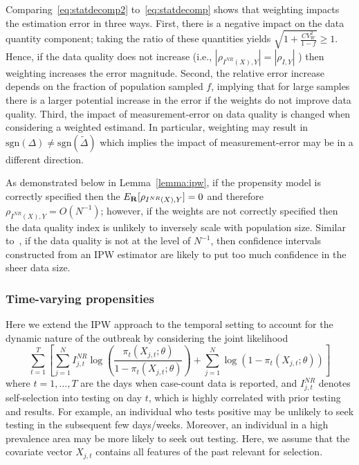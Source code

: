 \documentclass[11pt]{amsart}
\numberwithin{equation}{section}
\theoremstyle{plain}
\begin{document}
 Comparing~\eqref{eq:statdecomp2} to~\eqref{eq:statdecomp} shows that weighting impacts the estimation error in three ways.  First, there is a negative impact on the data quantity component; taking the ratio of these quantities yields
 $\sqrt{1 + \frac{CV_W^2}{1-f}} \geq 1$.  Hence, if the data quality does not increase (i.e., $| \rho_{I^{NR} (X), Y} | = | \rho_{I,Y}|$ ) then weighting increases the error magnitude.  Second, the relative error increase depends on the fraction of population sampled $f$, implying that for large samples there is a larger potential increase in the error if the weights do not improve data quality. Third, the impact of measurement-error on data quality is changed when considering a weighted estimand. In particular, weighting may result in $\text{sgn}(\Delta) \neq \text{sgn} (\tilde \Delta)$ which implies the impact of measurement-error may be in a different direction.

 As demonstrated below in Lemma~\ref{lemma:ipw}, if the propensity model is correctly specified then the $E_{\bf R} [ \rho_{I^{NR} (X), Y} ] = 0$ and therefore $\rho_{I^{NR} (X), Y} = O(N^{-1})$; however, if the weights are not correctly specified then the data quality index is unlikely to inversely scale with population size.
 Similar to~\cite{Meng2018}, if the data quality is not at the level of $N^{-1}$, then confidence intervals constructed from an IPW estimator are likely to put too much confidence in the sheer data size.

 \subsubsection{Time-varying propensities}

 Here we extend the IPW approach to the temporal setting to account for the dynamic nature of the outbreak by considering the joint likelihood
 \begin{equation}
 \label{eq:tvpropensity}
 \sum_{t=1}^T \left[ \sum_{j=1}^N I^{NR}_{j,t} \log \left( \frac{\pi_t (X_{j,t}; \theta)}{1-\pi_t(X_{j,t}; \theta)} \right) + \sum_{j=1}^N \log \left( 1 - \pi_t (X_{j,t}; \theta) \right) \right]
 \end{equation}
 where $t=1,\ldots,T$ are the days when case-count data is reported, and $I^{NR}_{j,t}$ denotes self-selection into testing on day $t$, which is highly correlated with prior testing and results.  For example, an individual who tests positive may be unlikely to seek testing in the subsequent few days/weeks.  Moreover, an individual in a high prevalence area may be more likely to seek out testing.  Here, we assume that the covariate vector $X_{j,t}$ contains all features of the past relevant for selection.
\end{document}
